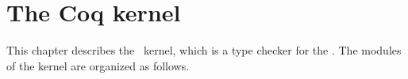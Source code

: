 
\newpage
\section*{The Coq kernel}

\ocwsection \label{kernel}
This chapter describes the \Coq\ kernel, which is a type checker for the \CCI.
The modules of the kernel are organized as follows.

\bigskip
\begin{center}\end{center}
